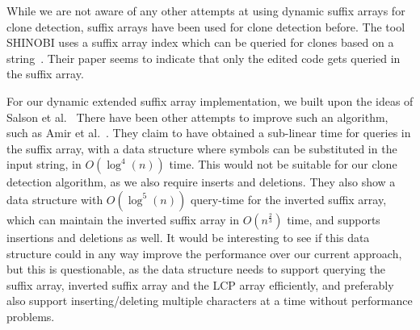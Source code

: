 While we are not aware of any other attempts at using dynamic suffix arrays for clone
detection, suffix arrays have been used for clone detection before. The tool SHINOBI uses
a suffix array index which can be queried for clones based on a string~\cite{SHINOBI}.
Their paper seems to indicate that only the edited code gets queried in the suffix array.

For our dynamic extended suffix array implementation, we built upon the ideas of Salson et
al.~\cite{DynamicExtendedSuffixArrays, DynamicExtendedSuffixArraysReorderings, DynamicBWT}
There have been other attempts to improve such an algorithm, such as Amir et
al.~\cite{AmirDynamicSuffixWithPoly}. They claim to have obtained a sub-linear time for
queries in the suffix array, with a data structure where symbols can be substituted in the
input string, in $O(\log^4(n))$ time. This would not be suitable for our clone detection
algorithm, as we also require inserts and deletions. They also show a data structure with
$O(\log^5(n))$ query-time for the inverted suffix array, which can maintain the inverted
suffix array in $O(n^{\frac{2}{3}})$ time, and supports insertions and deletions as well.
It would be interesting to see if this data structure could in any way improve the
performance over our current approach, but this is questionable, as the data structure
needs to support querying the suffix array, inverted suffix array and the LCP array
efficiently, and preferably also support inserting/deleting multiple characters at a time
without performance problems.
